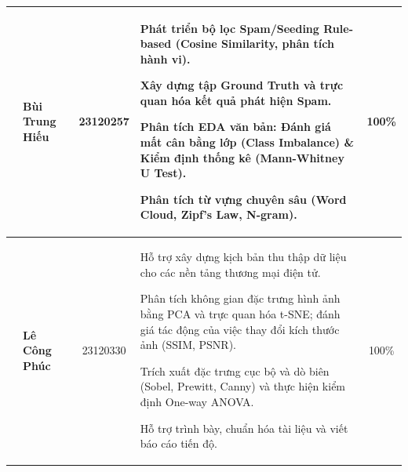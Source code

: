 \begin{center}
\begin{tabularx}{\textwidth}{|>{\stepcounter{memberrow}\thememberrow}c|p{3.5cm}|c|X|c|}
        & \textbf{Bùi Trung Hiếu} & 23120257 &
        \begin{tableitemize}
            \item Phát triển bộ lọc Spam/Seeding Rule-based (Cosine Similarity, phân tích hành vi).
            \item Xây dựng tập Ground Truth và trực quan hóa kết quả phát hiện Spam.
            \item Phân tích EDA văn bản: Đánh giá mất cân bằng lớp (Class Imbalance) \& Kiểm định thống kê (Mann-Whitney U Test).
            \item Phân tích từ vựng chuyên sâu (Word Cloud, Zipf's Law, N-gram).
        \end{tableitemize} & 100\% \\ \hline

        & \textbf{Lê Công Phúc} & 23120330 &
        \begin{tableitemize}
            \item Hỗ trợ xây dựng kịch bản thu thập dữ liệu cho các nền tảng thương mại điện tử.
            \item Phân tích không gian đặc trưng hình ảnh bằng PCA và trực quan hóa t-SNE; đánh giá tác động của việc thay đổi kích thước ảnh (SSIM, PSNR).
            \item Trích xuất đặc trưng cục bộ và dò biên (Sobel, Prewitt, Canny) và thực hiện kiểm định One-way ANOVA.
            \item Hỗ trợ trình bày, chuẩn hóa tài liệu và viết báo cáo tiến độ.
        \end{tableitemize} & 100\% \\ \hline

    \end{tabularx}
\end{center}

\clearpage
